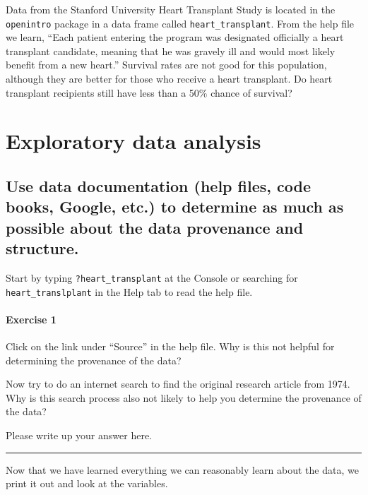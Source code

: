 \documentclass[
]{book}
\begin{document}
Data from the Stanford University Heart Transplant Study is located in the \texttt{openintro} package in a data frame called \texttt{heart\_transplant}. From the help file we learn, ``Each patient entering the program was designated officially a heart transplant candidate, meaning that he was gravely ill and would most likely benefit from a new heart.'' Survival rates are not good for this population, although they are better for those who receive a heart transplant. Do heart transplant recipients still have less than a 50\% chance of survival?

\hypertarget{one-prop-ex-eda}{%
\section{Exploratory data analysis}\label{one-prop-ex-eda}}

\hypertarget{one-prop-ex-documentation}{%
\subsection{Use data documentation (help files, code books, Google, etc.) to determine as much as possible about the data provenance and structure.}\label{one-prop-ex-documentation}}

Start by typing \texttt{?heart\_transplant} at the Console or searching for \texttt{heart\_translplant} in the Help tab to read the help file.

\hypertarget{exercise-1-11}{%
\paragraph*{Exercise 1}\label{exercise-1-11}}

Click on the link under ``Source'' in the help file. Why is this not helpful for determining the provenance of the data?

Now try to do an internet search to find the original research article from 1974. Why is this search process also not likely to help you determine the provenance of the data?

Please write up your answer here.

\begin{center}\rule{0.5\linewidth}{0.5pt}\end{center}

Now that we have learned everything we can reasonably learn about the data, we print it out and look at the variables.
\end{document}
